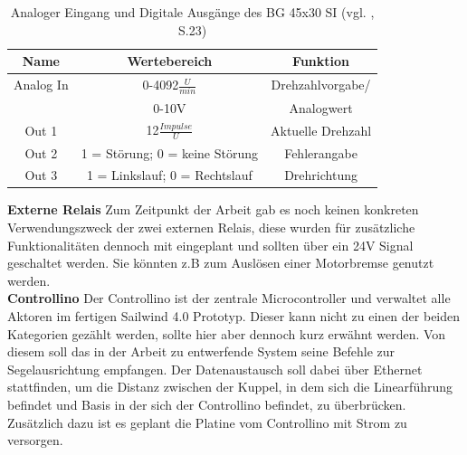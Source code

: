 \begin{table}[H]
	\centering
	\begin{tabular}{|c|c|c|}
		\hline
		\textbf{Name} & \textbf{Wertebereich} & \textbf{Funktion}      \\ \hline
		Analog In                & 0-4092$\frac{U}{min}$                        & Drehzahlvorgabe/            \\ & 0-10V & Analogwert \\ \hline		Out 1                & 12$\frac{Impulse}{U}$                        & Aktuelle Drehzahl             \\ \hline
		Out 2                & 1 = Störung; 0 = keine Störung                        &  Fehlerangabe            \\ \hline
		Out 3              & 1 = Linkslauf; 0 = Rechtslauf                       &  Drehrichtung           \\ \hline
	\end{tabular}%
	\caption{Analoger Eingang und Digitale Ausgänge des BG 45x30 SI (vgl. \cite{BG_45}, S.23)}
	\label{tab:andere_Ausgaenge}
\end{table}

\noindent\textbf{Externe Relais}\newline
Zum Zeitpunkt der Arbeit gab es noch keinen konkreten Verwendungszweck der zwei externen Relais, diese wurden für zusätzliche Funktionalitäten dennoch mit eingeplant und sollten über ein 24V Signal geschaltet werden. Sie könnten z.B zum Auslösen einer Motorbremse genutzt werden.\\

\noindent\textbf{Controllino}\newline
Der Controllino ist der zentrale Microcontroller und verwaltet alle Aktoren im fertigen Sailwind 4.0 Prototyp. Dieser kann nicht zu einen der beiden Kategorien gezählt werden, sollte hier aber dennoch kurz erwähnt werden. Von diesem soll das in der Arbeit zu entwerfende System seine Befehle zur Segelausrichtung empfangen. Der Datenaustausch soll dabei über Ethernet stattfinden, um die Distanz zwischen der Kuppel, in dem sich die Linearführung befindet und Basis in der sich der Controllino befindet, zu überbrücken. Zusätzlich dazu ist es geplant die Platine vom Controllino mit Strom zu versorgen.
